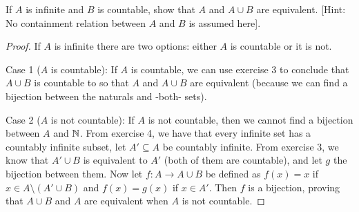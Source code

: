 \begin{exercise}{6}
If $A$ is infinite and $B$ is countable, show that $A$ and $A\cup B$ are equivalent. [Hint: No containment relation between $A$ and $B$ is assumed here].
\end{exercise}
\begin{proof}
If $A$ is infinite there are two options: either $A$ is countable or it is not. 

Case 1 ($A$ is countable): If $A$ is countable, we can use exercise 3 to conclude that $A\cup B$ is countable to so that $A$ and $A\cup B$ are equivalent (because we can find a bijection between the naturals and -both- sets).

Case 2 ($A$ is not countable): If $A$ is not countable, then we cannot find a bijection between $A$ and $\mathbb{N}$. From exercise 4, we have that every infinite set has a countably infinite subset, let $A'\subseteq A$ be countably infinite. From exercise 3, we know that $A'\cup B$ is equivalent to $A'$ (both of them are countable), and let $g$ the bijection between them. Now let $f:A\to A\cup B$ be defined as $f(x)=x$ if $x\in A\setminus (A'\cup B)$ and $f(x)=g(x)$ if $x\in A'$. Then $f$ is a bijection, proving that $A\cup B$ and $A$ are equivalent when $A$ is not countable.
\end{proof} 


